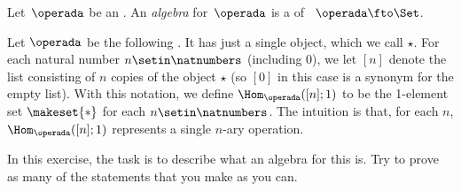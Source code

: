 
\begin{definition}
    \label{def:algebra-operad}
    Let~$\operada$ be an .
    An \emph{algebra} for~$\operada$ is a  of ~$\operada \fto \Set$.
\end{definition}



\begin{gradedexercise}
    \label{ex:MonoidsAsAlgebras}
    Let $\operada$ be the following .
    It has just a single object, which we call $\star$.
    For each natural number $n \setin \natnumbers$ (including $0$), we let $[n]$ denote the list consisting of $n$ copies of the object $\star$ (so $[0]$ in this case is a synonym for the empty list).
    With this notation, we define $\Hom_\operada([n];1)$ to be the 1-element set $\makeset{ * }$ for each $n \setin \natnumbers$.
    The intuition is that, for each $n$, $\Hom_\operada([n];1)$ represents a single $n$-ary operation.

    In this exercise, the task is to describe what an algebra for this  is.
    Try to prove as many of the statements that you make as you can.
\end{gradedexercise}



